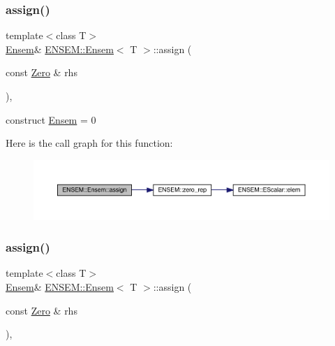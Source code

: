 \subsubsection{\texorpdfstring{assign()}{assign()}\hspace{0.1cm}{\footnotesize\ttfamily [10/12]}}
{\footnotesize\ttfamily template$<$class T$>$ \\
\mbox{\hyperlink{classENSEM_1_1Ensem}{Ensem}}\& \mbox{\hyperlink{classENSEM_1_1Ensem}{E\+N\+S\+E\+M\+::\+Ensem}}$<$ T $>$\+::assign (\begin{DoxyParamCaption}\item[{const \mbox{\hyperlink{structENSEM_1_1Zero}{Zero}} \&}]{rhs }\end{DoxyParamCaption})\hspace{0.3cm}{\ttfamily [inline]}, {\ttfamily [protected]}}



construct \mbox{\hyperlink{classENSEM_1_1Ensem}{Ensem}} = 0 

Here is the call graph for this function\+:
\nopagebreak
\begin{figure}[H]
\begin{center}
\leavevmode
\includegraphics[width=350pt]{d7/d3e/classENSEM_1_1Ensem_a140d8bb94d07a0abfb2ad396df63c625_cgraph}
\end{center}
\end{figure}
\mbox{\label{classENSEM_1_1Ensem_a140d8bb94d07a0abfb2ad396df63c625}} 
\subsubsection{\texorpdfstring{assign()}{assign()}\hspace{0.1cm}{\footnotesize\ttfamily [11/12]}}
{\footnotesize\ttfamily template$<$class T$>$ \\
\mbox{\hyperlink{classENSEM_1_1Ensem}{Ensem}}\& \mbox{\hyperlink{classENSEM_1_1Ensem}{E\+N\+S\+E\+M\+::\+Ensem}}$<$ T $>$\+::assign (\begin{DoxyParamCaption}\item[{const \mbox{\hyperlink{structENSEM_1_1Zero}{Zero}} \&}]{rhs }\end{DoxyParamCaption})\hspace{0.3cm}{\ttfamily [inline]}, {\ttfamily [protected]}}



